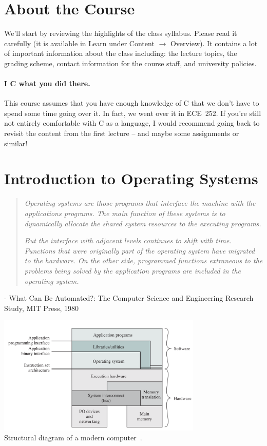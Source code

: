 




\section*{About the Course}
We'll start by reviewing the highlights of the class syllabus. Please read it carefully (it is available in Learn under Content $\rightarrow$ Overview). It contains a lot of important information about the class including: the lecture topics, the grading scheme, contact information for the course staff, and university policies.

\paragraph{I C what you did there.}
This course assumes that you have enough knowledge of C that we don't have to spend some time going over it. In fact, we went over it in ECE~252. If you're still not entirely comfortable with C as a language, I would recommend going back to revisit the content from the first lecture -- and maybe some assignments or similar!

\section*{Introduction to Operating Systems}


\begin{quote}
\textit{Operating systems are those programs that interface the machine with the applications programs. The main function of these systems is to dynamically allocate the shared system resources to the executing programs.}

\textit{But the interface with adjacent levels continues to shift with
time. Functions that were originally part of the operating system have migrated to the hardware. On the other side, programmed functions extraneous to the problems being solved by the application programs are included in the operating system.
}
\end{quote}

\hfill - What Can Be Automated?: The Computer Science and Engineering Research Study, MIT Press, 1980

\begin{center}
\includegraphics[width=0.73\textwidth]{images/os-sw-hw.png}\\
Structural diagram of a modern computer~\cite{osi}.
\end{center}

